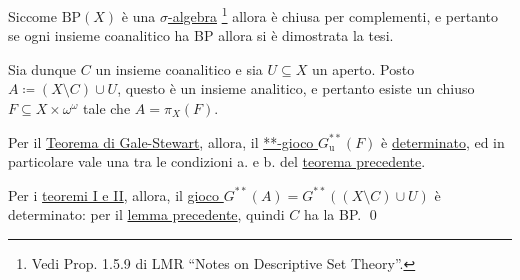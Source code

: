 \documentclass{article}
\newcommand{\1}{\mathds{1}}
\begin{document}
Siccome \(\mathrm{BP}(X)\) è una \href{../../../../../../../org/roam/20250526100313-sigma_algebra.org}{\(\sigma\)-algebra} \footnote{Vedi Prop. 1.5.9 di LMR ``Notes on Descriptive Set Theory''.} allora è chiusa per complementi, e pertanto se ogni insieme coanalitico ha BP allora si è dimostrata la tesi.

Sia dunque \(C\) un insieme coanalitico e sia \(U \subseteq X\) un aperto. Posto \(A\coloneqq (X\setminus C)\cup U\), questo è un insieme analitico, e pertanto  esiste un chiuso \(F \subseteq X\times\omega^{\omega}\) tale che \(A=\pi_{X}(F)\).

Per il \href{../../../../../../../org/roam/20250514144736-teorema_di_gale_stewart.org}{Teorema di Gale-Stewart}, allora, il \hyperref[sec:org8e1057c]{**-gioco \(G^{ * *}_{\text{u}}(F)\)} è \hyperref[sec:org7f68e17]{determinato}, ed in particolare vale una tra le condizioni a. e b. del \href{../../../../../../../org/roam/20250514175252-magrezza_dentro_ad_un_polacco_tramite_gioco_di_banach_mazur.org}{teorema precedente}.

Per i \href{../../../../../../../org/roam/20250514174717-teorema_di_caratterizzazione_dei_comagri_tramite_il_gioco_di_banach_mazur.org}{teoremi I e II}, allora, il \hyperref[sec:orge8e0b9e]{gioco \(G^{**}(A) = G^{ * *}\left((X\setminus C) \cup U\right)\)} è determinato: per il \href{../../../../../../../org/roam/20250526100910-caratterizzazione_bp_tramite_gioco_di_banach_mazur.org}{lemma precedente}, quindi \(C\) ha la BP. \qed
\end{document}
